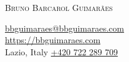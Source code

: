 {\huge \textsc{Bruno Barcarol Guimarães}}

{\scriptsize {}}
\vspace{-3\baselineskip}
\begin{flushright}
    \href{mailto:bbguimaraes@bbguimaraes.com}{bbguimaraes@bbguimaraes.com} \\
    \url{https://bbguimaraes.com} \\
    Lazio, Italy {} \href{tel:+420722289709}{+420 722 289 709}
\end{flushright}
